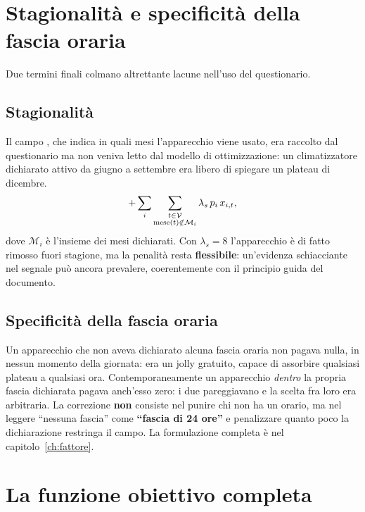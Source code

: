 \section{Stagionalità e specificità della fascia oraria}

Due termini finali colmano altrettante lacune nell'uso del questionario.

\subsection*{Stagionalità}

Il campo , che indica in quali mesi l'apparecchio viene usato, era raccolto dal
questionario ma non veniva letto dal modello di ottimizzazione: un climatizzatore dichiarato attivo
da giugno a settembre era libero di spiegare un plateau di dicembre.
\begin{equation}
  + \sum_{i} \sum_{\substack{t \in \mathcal{V} \\ \text{mese}(t) \notin \mathcal{M}_i}}
    \lambda_s \, p_i \, x_{i,t} ,
  \label{eq:stagione}
\end{equation}
dove $\mathcal{M}_i$ è l'insieme dei mesi dichiarati. Con $\lambda_s = 8$ l'apparecchio è di fatto
rimosso fuori stagione, ma la penalità resta \textbf{flessibile}: un'evidenza schiacciante nel
segnale può ancora prevalere, coerentemente con il principio guida del documento.

\subsection*{Specificità della fascia oraria}

Un apparecchio che non aveva dichiarato alcuna fascia oraria non pagava nulla, in nessun momento
della giornata: era un jolly gratuito, capace di assorbire qualsiasi plateau a qualsiasi ora.
Contemporaneamente un apparecchio \emph{dentro} la propria fascia dichiarata pagava anch'esso zero:
i due pareggiavano e la scelta fra loro era arbitraria. La correzione \textbf{non} consiste nel
punire chi non ha un orario, ma nel leggere ``nessuna fascia'' come \textbf{``fascia di 24 ore''} e
penalizzare quanto poco la dichiarazione restringa il campo. La formulazione completa è nel
capitolo~\ref{ch:fattore}.

\section{La funzione obiettivo completa}

